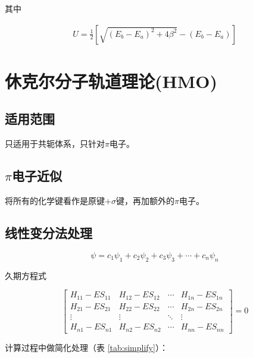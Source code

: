 其中

\begin{align*}
	U = \frac{1}{2} \left[ \sqrt{ \left(E_b - E_a\right)^2 + 4\beta^2} - \left(E_b - E_a\right) \right]
\end{align*}

\section{休克尔分子轨道理论(HMO)}

\subsection{适用范围}

只适用于共轭体系，只针对$\pi$电子。

\subsection{$\pi$电子近似}

将所有的化学键看作是原键+$\sigma$键，再加额外的$\pi$电子。


\subsection{线性变分法处理}


\begin{equation*}
	\psi = c_1 \psi_1 + c_2 \psi_2 + c_3 \psi_3 + \cdots + c_n \psi_n
\end{equation*}

久期方程式

\begin{equation*}
	\begin{bmatrix*}
		H_{11} - ES_{11} & H_{12} - ES_{12} & \cdots & H_{1n} - ES_{1n} \\
		H_{21} - ES_{21} & H_{22} - ES_{22} & \cdots & H_{2n} - ES_{2n} \\
		\vdots & \vdots & \ddots & \vdots \\
		H_{n1} - ES_{n1} & H_{n2} - ES_{n2} & \cdots & H_{nn} - ES_{nn}
	\end{bmatrix*} = 0
\end{equation*}

计算过程中做简化处理（表 \ref{tab:simplify}）：


